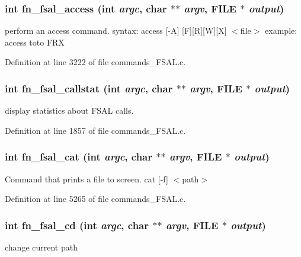 \subsubsection[{fn\_\-fsal\_\-access}]{\setlength{\rightskip}{0pt plus 5cm}int fn\_\-fsal\_\-access (int {\em argc}, \/  char $\ast$$\ast$ {\em argv}, \/  FILE $\ast$ {\em output})}\label{commands__FSAL_8c_aa55a8451b4dd88ef76baea99bbef6761}
perform an access command. syntax: access [-\/A] [F][R][W][X] $<$file$>$ example: access toto FRX 

Definition at line 3222 of file commands\_\-FSAL.c.
\subsubsection[{fn\_\-fsal\_\-callstat}]{\setlength{\rightskip}{0pt plus 5cm}int fn\_\-fsal\_\-callstat (int {\em argc}, \/  char $\ast$$\ast$ {\em argv}, \/  FILE $\ast$ {\em output})}\label{commands__FSAL_8c_a4acd9c0eb120bb1f3dc888538b1996cb}
display statistics about FSAL calls. 

Definition at line 1857 of file commands\_\-FSAL.c.
\subsubsection[{fn\_\-fsal\_\-cat}]{\setlength{\rightskip}{0pt plus 5cm}int fn\_\-fsal\_\-cat (int {\em argc}, \/  char $\ast$$\ast$ {\em argv}, \/  FILE $\ast$ {\em output})}\label{commands__FSAL_8c_afcf5d8ad163ca5a5aef0952851a37dbf}
Command that prints a file to screen. cat [-\/f] $<$path$>$ 

Definition at line 5265 of file commands\_\-FSAL.c.
\subsubsection[{fn\_\-fsal\_\-cd}]{\setlength{\rightskip}{0pt plus 5cm}int fn\_\-fsal\_\-cd (int {\em argc}, \/  char $\ast$$\ast$ {\em argv}, \/  FILE $\ast$ {\em output})}\label{commands__FSAL_8c_a1e383e905f534a477fa6002c8344114c}
change current path 

